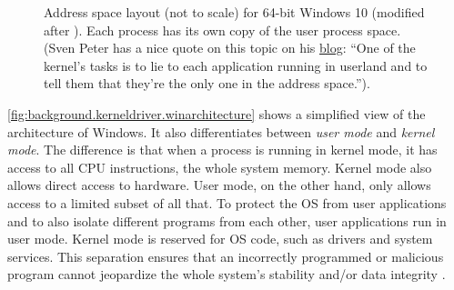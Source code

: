 \begin{figure}[htb!]
	\center
	\caption[
		Address space layout for 64-bit Windows 10.
	]{
		Address space layout (not to scale) for 64-bit Windows 10 (modified after \cite{Yosifovich2017}). %
		Each process has its own copy of the user process space.\\
		(Sven Peter has a nice quote on this topic on his \href{https://blog.svenpeter.dev/posts/m1_sprr_gxf/}{blog}: ``One of the kernel's tasks is to lie to each application running in userland and to tell them that they're the only one in the address space.'').
	}
	\label{fig:background.kerneldriver.winvirtualmemory}
\end{figure}

\autoref{fig:background.kerneldriver.winarchitecture} shows a simplified view of the architecture of Windows. It also differentiates between \emph{user mode} and \emph{kernel mode}. The difference is that when a process is running in kernel mode, it has access to all CPU instructions, the whole system memory. Kernel mode also allows direct access to hardware. User mode, on the other hand, only allows access to a limited subset of all that. To protect the OS from user applications and to also isolate different programs from each other, user applications run in user mode. Kernel mode is reserved for OS code, such as drivers and system services. This separation ensures that an incorrectly programmed or malicious program cannot jeopardize the whole system's stability and/or data integrity \cite{Yosifovich2017}.

